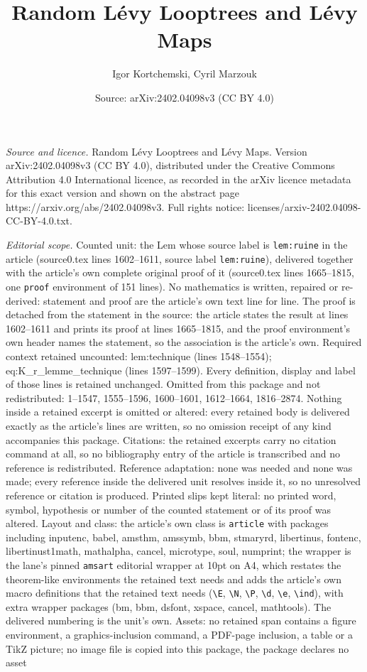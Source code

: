 \documentclass[10pt,a4paper]{amsart}
\title[Random L\'evy Looptrees and L\'evy Maps]{Random L\'evy Looptrees and L\'evy Maps}
\author{Igor Kortchemski, Cyril Marzouk}
\date{Source: arXiv:2402.04098v3 (CC BY 4.0)}
\begin{document}
\maketitle

\noindent\emph{Source and licence.} Random L\'evy Looptrees and L\'evy Maps. Version arXiv:2402.04098v3 (CC BY 4.0), distributed under the Creative Commons Attribution 4.0 International licence, as recorded in the arXiv licence metadata for this exact version and shown on the abstract page https://arxiv.org/abs/2402.04098v3. Full rights notice: licenses/arxiv-2402.04098-CC-BY-4.0.txt.\par\smallskip

\noindent\textit{Editorial scope.} Counted unit: the Lem whose source label is \texttt{lem:ruine} in the article (source0.tex lines 1602--1611, source label \texttt{lem:ruine}), delivered together with the article's own complete original proof of it (source0.tex lines 1665--1815, one \texttt{proof} environment of 151 lines). No mathematics is written, repaired or re-derived: statement and proof are the article's own text line for line. The proof is detached from the statement in the source: the article states the result at lines 1602--1611 and prints its proof at lines 1665--1815, and the proof environment's own header names the statement, so the association is the article's own. Required context retained uncounted: lem:technique (lines 1548--1554); eq:K\_r\_lemme\_technique (lines 1597--1599). Every definition, display and label of those lines is retained unchanged. Omitted from this package and not redistributed: 1--1547, 1555--1596, 1600--1601, 1612--1664, 1816--2874. Nothing inside a retained excerpt is omitted or altered: every retained body is delivered exactly as the article's lines are written, so no omission receipt of any kind accompanies this package. Citations: the retained excerpts carry no citation command at all, so no bibliography entry of the article is transcribed and no reference is redistributed. Reference adaptation: none was needed and none was made; every reference inside the delivered unit resolves inside it, so no unresolved reference or citation is produced. Printed slips kept literal: no printed word, symbol, hypothesis or number of the counted statement or of its proof was altered. Layout and class: the article's own class is \texttt{article} with packages including inputenc, babel, amsthm, amssymb, bbm, stmaryrd, libertinus, fontenc, libertinust1math, mathalpha, cancel, microtype, soul, numprint; the wrapper is the lane's pinned \texttt{amsart} editorial wrapper at 10pt on A4, which restates the theorem-like environments the retained text needs and adds the article's own macro definitions that the retained text needs (\texttt{\textbackslash E}, \texttt{\textbackslash N}, \texttt{\textbackslash P}, \texttt{\textbackslash d}, \texttt{\textbackslash e}, \texttt{\textbackslash ind}), with extra wrapper packages (bm, bbm, dsfont, xspace, cancel, mathtools). The delivered numbering is the unit's own. Assets: no retained span contains a figure environment, a graphics-inclusion command, a PDF-page inclusion, a table or a TikZ picture; no image file is copied into this package, the package declares no asset 
\end{document}
